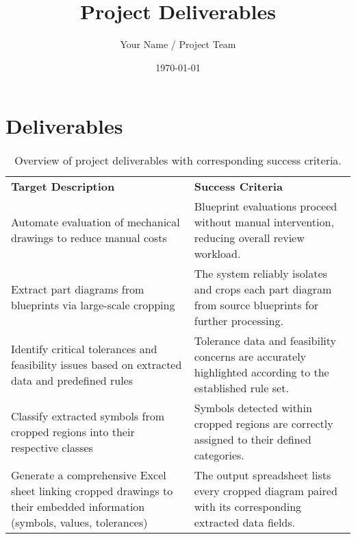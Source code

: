 \documentclass[a4paper,12pt]{article}
\title{Project Deliverables}
\author{Your Name / Project Team}
\date{\today}
\begin{document}
\maketitle

\section*{Deliverables}

\begin{table}[h!]
  \centering
  \begin{tabular}{p{} p{}}
    \textbf{Target Description} & \textbf{Success Criteria} \\
    Automate evaluation of mechanical drawings to reduce manual costs & Blueprint evaluations proceed without manual intervention, reducing overall review workload. \\
    Extract part diagrams from blueprints via large-scale cropping & The system reliably isolates and crops each part diagram from source blueprints for further processing. \\
    Identify critical tolerances and feasibility issues based on extracted data and predefined rules & Tolerance data and feasibility concerns are accurately highlighted according to the established rule set. \\
    Classify extracted symbols from cropped regions into their respective classes & Symbols detected within cropped regions are correctly assigned to their defined categories. \\
    Generate a comprehensive Excel sheet linking cropped drawings to their embedded information (symbols, values, tolerances) & The output spreadsheet lists every cropped diagram paired with its corresponding extracted data fields. \\
  \end{tabular}
  \caption{Overview of project deliverables with corresponding success criteria.}
  \label{tab:deliverables}
\end{table}
\end{document}
